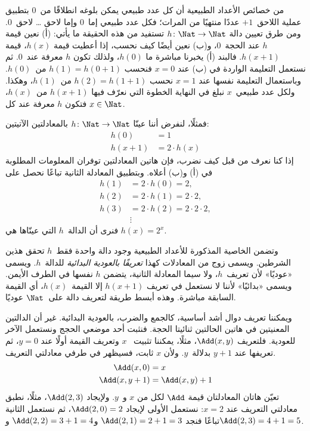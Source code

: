 \documentclass[../../../include/open-logic-section]{subfiles}
\begin{document}

من خصائص الأعداد الطبيعية أن كل عدد طبيعي يمكن بلوغه انطلاقًا من~$0$
بتطبيق عملية اللاحق~$+1$ عددًا منتهيًا من المرات؛ فكل عدد طبيعي إما~$0$
وإما لاحق … لاحق~$0$. ومن طرق تعيين دالة
$h\colon\Nat \to \Nat$ تستفيد من هذه الحقيقة ما يأتي:
(أ) نعين قيمة $h$ عند الحجة~$0$، و(ب) نعين أيضًا كيف نحسب، إذا أعطيت
قيمة $h(x)$، قيمة $h(x+1)$. فالبند (أ) يخبرنا مباشرة ما $h(0)$، ولذلك
تكون $h$ معرفة عند~$0$. ثم نستعمل التعليمة الواردة في (ب) عند $x=0$
فنحسب $h(1)=h(0+1)$ من~$h(0)$. وباستعمال التعليمة نفسها عند $x=1$
نحسب $h(2)=h(1+1)$ من~$h(1)$، وهكذا. ولكل عدد طبيعي~$x$ نبلغ في
النهاية الخطوة التي نعرّف فيها $h(x+1)$ من~$h(x)$، فتكون $h$ معرفة
عند كل $x\in\Nat$.

فمثلًا، لنفرض أننا عينّا $h\colon\Nat\to\Nat$ بالمعادلتين الآتيتين:
\begin{align*}
h(0) & =  1\\
h(x+1) & =  2 \cdot h(x)
\end{align*}
إذا كنا نعرف من قبل كيف نضرب، فإن هاتين المعادلتين توفران المعلومات
المطلوبة في (أ) و(ب) أعلاه. وبتطبيق المعادلة الثانية تباعًا نحصل على
\begin{align*}
  h(1) & = 2\cdot h(0) = 2,\\
  h(2) & = 2\cdot h(1) = 2\cdot 2,\\
  h(3) & = 2 \cdot h(2) = 2\cdot 2 \cdot 2,\\
  & \vdots
\end{align*}
فنرى أن الدالة~$h$ التي عينّاها هي $h(x)=2^x$.

وتضمن الخاصية المذكورة للأعداد الطبيعية وجود دالة واحدة فقط~$h$ تحقق
هذين الشرطين. ويسمى زوج من المعادلات كهذا \emph{تعريفًا بالعودية
البدائية} للدالة~$h$. ويسمى «عوديًا» لأن تعريف~$h$، ولا سيما المعادلة
الثانية، يتضمن $h$ نفسها في الطرف الأيمن. ويسمى «بدائيًا» لأننا لا
نستعمل في تعريف $h(x+1)$ إلا القيمة~$h(x)$، أي القيمة السابقة مباشرة.
وهذه أبسط طريقة لتعريف دالة على~$\Nat$ عوديًا.

ويمكننا تعريف دوال أشد أساسية، كالجمع والضرب، بالعودية البدائية. غير أن
الدالتين المعنيتين في هاتين الحالتين ثنائيتا الحجة. فنثبت أحد موضعي
الحجج ونستعمل الآخر للعودية. فلتعريف $\Add(x,y)$، مثلًا، يمكننا تثبيت
~$x$ وتعريف القيمة أولًا عند $y=0$، ثم تعريفها عند $y+1$ بدلالة~$y$.
ولأن $x$ ثابت، فسيظهر في طرفي معادلتي التعريف.
\begin{align*}
\Add(x,0) & =  x\\
\Add(x,y+1) & =  \Add(x,y)+1
\end{align*}
تعيّن هاتان المعادلتان قيمة $\Add$ لكل من $x$ و~$y$. ولإيجاد
$\Add(2,3)$، مثلًا، نطبق معادلتي التعريف عند $x=2$: نستعمل الأولى
لإيجاد $\Add(2,0)=2$، ثم نستعمل الثانية تباعًا فنجد
$\Add(2,1)=2+1=3$ و$\Add(2,2)=3+1=4$ و$\Add(2,3)=4+1=5$.
\end{document}
